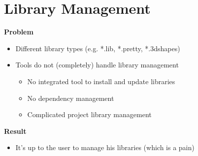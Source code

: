 \section{Library Management}

\begin{frame}{\secname}
  \textbf{Problem}
  \begin{itemize}
    \item Different library types (e.g. *.lib, *.pretty, *.3dshapes)
    \item Tools do not (completely) handle library management
    \begin{itemize}
      \item No integrated tool to install and update libraries
      \item No dependency management
      \item Complicated project library management
    \end{itemize}
  \end{itemize}
  
  \pause
  
  \textbf{Result}
  \begin{itemize}
    \item It's up to the user to manage his libraries (which is a pain)
  \end{itemize}
\end{frame}

